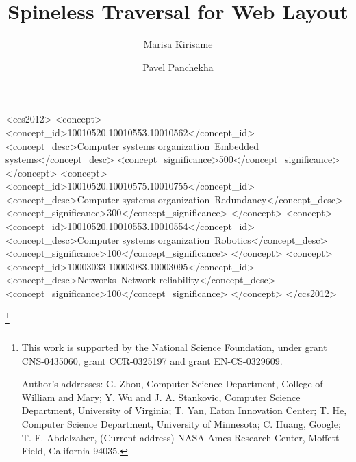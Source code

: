 \documentclass[format=acmsmall, review=false, screen=true]{acmart}
\begin{document}
\title[Spineless]{Spineless Traversal for Web Layout}  
\author{Marisa Kirisame}
\author{Pavel Panchekha}

\begin{abstract}

\end{abstract}


%
%
\begin{CCSXML}
<ccs2012>
 <concept>
  <concept_id>10010520.10010553.10010562</concept_id>
  <concept_desc>Computer systems organization~Embedded systems</concept_desc>
  <concept_significance>500</concept_significance>
 </concept>
 <concept>
  <concept_id>10010520.10010575.10010755</concept_id>
  <concept_desc>Computer systems organization~Redundancy</concept_desc>
  <concept_significance>300</concept_significance>
 </concept>
 <concept>
  <concept_id>10010520.10010553.10010554</concept_id>
  <concept_desc>Computer systems organization~Robotics</concept_desc>
  <concept_significance>100</concept_significance>
 </concept>
 <concept>
  <concept_id>10003033.10003083.10003095</concept_id>
  <concept_desc>Networks~Network reliability</concept_desc>
  <concept_significance>100</concept_significance>
 </concept>
</ccs2012>  
\end{CCSXML}


%
%




\thanks{This work is supported by the National Science Foundation,
  under grant CNS-0435060, grant CCR-0325197 and grant EN-CS-0329609.

  Author's addresses: G. Zhou, Computer Science Department, College of
  William and Mary; Y. Wu {and} J. A. Stankovic, Computer Science
  Department, University of Virginia; T. Yan, Eaton Innovation Center;
  T. He, Computer Science Department, University of Minnesota; C.
  Huang, Google; T. F. Abdelzaher, (Current address) NASA Ames
  Research Center, Moffett Field, California 94035.}
\end{document}
